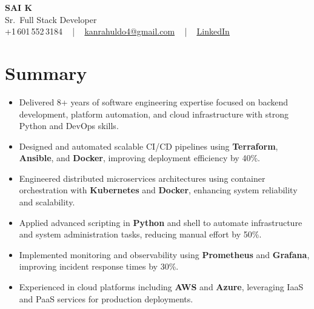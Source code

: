 \documentclass[letterpaper,11pt]{article}
\newcommand{\resumeItem}[1]{
  \item\footnotesize{
    {#1 \vspace{-2pt}}
  }
}
\newcommand{\resumeItemListStart}{\begin{itemize}[leftmargin=*]}
\newcommand{\resumeItemListEnd}{\end{itemize}\vspace{-5pt}}
\begin{document}
\begin{center}
    {\fontsize{14pt}{12pt}\selectfont \textbf{\MakeUppercase{Sai K}}}\\ \vspace{2pt}
    \fontsize{10pt}{12pt}\selectfont Sr.\ Full Stack Developer\\ \vspace{2pt}
    \fontsize{10pt}{12pt}\selectfont +1\,601\,552\,3184 ~ | ~
    \href{mailto:kanrahuldo4@gmail.com}{kanrahuldo4@gmail.com} ~ | ~
    \href{https://www.linkedin.com/in/srrrk/}{\color{blue}\underline{LinkedIn}}
    \vspace{-10pt}
\end{center}

\section{Summary}
\fontsize{9pt}{10pt}\selectfont
\resumeItemListStart
  \resumeItem{Delivered 8+ years of software engineering expertise focused on backend development, platform automation, and cloud infrastructure with strong Python and DevOps skills.}
  \resumeItem{Designed and automated scalable CI/CD pipelines using \textbf{Terraform}, \textbf{Ansible}, and \textbf{Docker}, improving deployment efficiency by 40\%.}
  \resumeItem{Engineered distributed microservices architectures using container orchestration with \textbf{Kubernetes} and \textbf{Docker}, enhancing system reliability and scalability.}
  \resumeItem{Applied advanced scripting in \textbf{Python} and shell to automate infrastructure and system administration tasks, reducing manual effort by 50\%.}
  \resumeItem{Implemented monitoring and observability using \textbf{Prometheus} and \textbf{Grafana}, improving incident response times by 30\%.}
  \resumeItem{Experienced in cloud platforms including \textbf{AWS} and \textbf{Azure}, leveraging IaaS and PaaS services for production deployments.}
\resumeItemListEnd
\vspace{-6pt}

\end{document}

